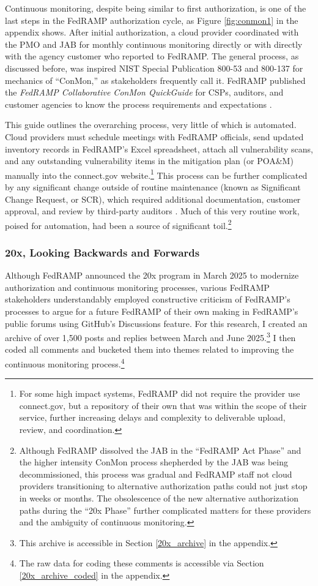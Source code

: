 \documentclass{jdf}
\begin{document}
Continuous monitoring, despite being similar to first authorization, is one of the last steps in the FedRAMP authorization cycle, as Figure \ref{fig:conmon1} in the appendix shows. After initial authorization, a cloud provider coordinated with the PMO and JAB for monthly continuous monitoring directly or with directly with the agency customer who reported to FedRAMP. The general process, as discussed before, was inspired NIST Special Publication 800-53 and 800-137 for mechanics of ``ConMon,'' as stakeholders frequently call it. FedRAMP published the \textit{FedRAMP Collaborative ConMon QuickGuide} for CSPs, auditors, and customer agencies to know the process requirements and expectations \citeyear{fedramp_cmqg23}.

This guide outlines the overarching process, very little of which is automated. Cloud providers must schedule meetings with FedRAMP officials, send updated inventory records in FedRAMP's Excel spreadsheet, attach all vulnerability scans, and any outstanding vulnerability items in the mitigation plan (or POA\&M) manually into the connect.gov website.\footnote{For some high impact systems, FedRAMP did not require the provider use connect.gov, but a repository of their own that was within the scope of their service, further increasing delays and complexity to deliverable upload, review, and coordination.} This process can be further complicated by any significant change outside of routine maintenance (known as Significant Change Request, or SCR), which required additional documentation, customer approval, and review by third-party auditors \cite{fedramp_cmqg23}. Much of this very routine work, poised for automation, had been a source of significant toil.\footnote{Although FedRAMP dissolved the JAB in the ``FedRAMP Act Phase'' and the higher intensity ConMon process shepherded by the JAB was being decommissioned, this process was gradual and FedRAMP staff not cloud providers transitioning to alternative authorization paths could not just stop in weeks or months. The obsolescence of the new alternative authorization paths during the ``20x Phase'' further complicated matters for these providers and the ambiguity of continuous monitoring.}

\subsubsection{20x, Looking Backwards and Forwards} \label{20x}

Although FedRAMP announced the 20x program in March 2025 to modernize authorization and continuous monitoring processes, various FedRAMP stakeholders understandably employed constructive criticism of FedRAMP's processes to argue for a future FedRAMP of their own making in FedRAMP's public forums using GitHub's Discussions feature. For this research, I created an archive of over 1,500 posts and replies between March and June 2025.\footnote{This archive is accessible in Section \ref{20x_archive} in the appendix.} I then coded all comments and bucketed them into themes related to improving the continuous monitoring process.\footnote{The raw data for coding these comments is accessible via Section \ref{20x_archive_coded} in the appendix.}
\end{document}
